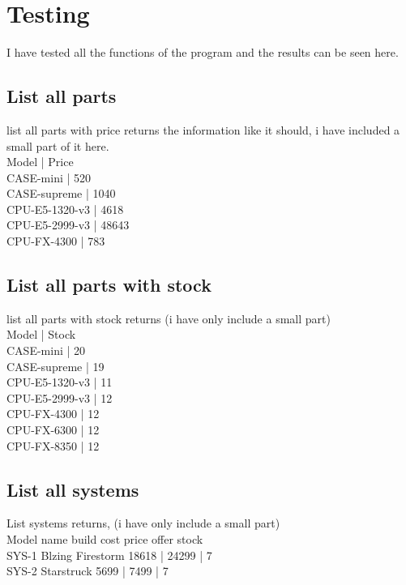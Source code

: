 \documentclass[a4paper,10pt,titlepage]{report}
\begin{document}
\section{Testing}
I have tested all the functions of the program and the results can be seen here. \\
\vspace{5 mm}
\subsection{List all parts}
list all parts with price returns the information like it should, i have included a small part of it here. \\
Model                         | Price\\
CASE-mini                         | 520 \\
CASE-supreme                      | 1040 \\
CPU-E5-1320-v3                    | 4618 \\
CPU-E5-2999-v3                    | 48643 \\
CPU-FX-4300                       | 783 \\
\vspace{5 mm}
\subsection{List all parts with stock}
list all parts with stock returns (i have only include a small part) \\
Model                         | Stock \\
CASE-mini                     | 20\\ 
CASE-supreme                  | 19\\
CPU-E5-1320-v3                | 11\\
CPU-E5-2999-v3                | 12\\
CPU-FX-4300                   | 12\\
CPU-FX-6300                   | 12\\
CPU-FX-8350                   | 12\\
\vspace{5 mm}
\subsection{List all systems}
List systems returns, (i have only include a small part)\\
Model                         name                          build cost     price offer stock \\
SYS-1                         Blzing Firestorm              18618      |    24299    |   7\\
SYS-2                         Starstruck                    5699      |    7499    |   7\\
\vspace{5 mm}
\end{document}
